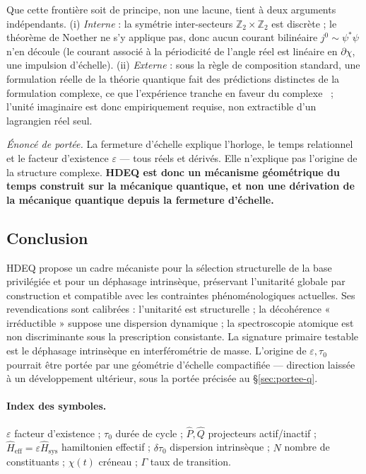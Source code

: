 \documentclass[11pt,a4paper]{article}
\newcommand{\Hsysop}{\hat{H}_{\mathrm{sys}}}
\newcommand{\Heff}{\hat{H}_{\mathrm{eff}}}
\theoremstyle{plain}
\theoremstyle{definition}
\theoremstyle{remark}
\begin{document}
Que cette fronti\`ere soit de principe, non une lacune, tient \`a deux arguments ind\'ependants. (i) \emph{Interne} : la sym\'etrie inter-secteurs $\mathbb{Z}_2\times\mathbb{Z}_2$ est discr\`ete ; le th\'eor\`eme de Noether ne s'y applique pas, donc aucun courant bilin\'eaire $j^0\sim\psi^*\psi$ n'en d\'ecoule (le courant associ\'e \`a la p\'eriodicit\'e de l'angle r\'eel est lin\'eaire en $\partial\chi$, une impulsion d'\'echelle). (ii) \emph{Externe} : sous la r\`egle de composition standard, une formulation r\'eelle de la th\'eorie quantique fait des pr\'edictions distinctes de la formulation complexe, ce que l'exp\'erience tranche en faveur du complexe~\cite{Renou,Chen} ; l'unit\'e imaginaire est donc empiriquement requise, non extractible d'un lagrangien r\'eel seul.

\emph{\'Enonc\'e de port\'ee.} La fermeture d'\'echelle explique l'horloge, le temps relationnel et le facteur d'existence $\varepsilon$ --- tous r\'eels et d\'eriv\'es. Elle n'explique pas l'origine de la structure complexe. \textbf{HDEQ est donc un m\'ecanisme g\'eom\'etrique du temps construit sur la m\'ecanique quantique, et non une d\'erivation de la m\'ecanique quantique depuis la fermeture d'\'echelle.}

\subsection{Conclusion}
HDEQ propose un cadre m\'ecaniste pour la s\'election structurelle de la base privil\'egi\'ee
et pour un d\'ephasage intrins\`eque, pr\'eservant l'unitarit\'e globale par construction et
compatible avec les contraintes ph\'enom\'enologiques actuelles. Ses revendications sont
calibr\'ees : l'unitarit\'e est structurelle ; la d\'ecoh\'erence « irr\'eductible » suppose une
dispersion dynamique ; la spectroscopie atomique est non discriminante sous la
prescription consistante. La signature primaire testable est le d\'ephasage intrins\`eque
en interf\'erom\'etrie de masse. L'origine de $\varepsilon,\tau_0$ pourrait \^etre port\'ee
par une g\'eom\'etrie d'\'echelle compactifi\'ee --- direction laiss\'ee \`a un d\'eveloppement
ult\'erieur, sous la port\'ee pr\'ecis\'ee au \S\ref{sec:portee-q}.

\paragraph{Index des symboles.}
$\varepsilon$ facteur d'existence ; $\tau_0$ dur\'ee de cycle ; $\hat P,\hat Q$
projecteurs actif/inactif ; $\Heff=\varepsilon\Hsysop$ hamiltonien effectif ;
$\delta\tau_0$ dispersion intrins\`eque ; $N$ nombre de constituants ; $\chi(t)$
cr\'eneau ; $\Gamma$ taux de transition.
\end{document}
